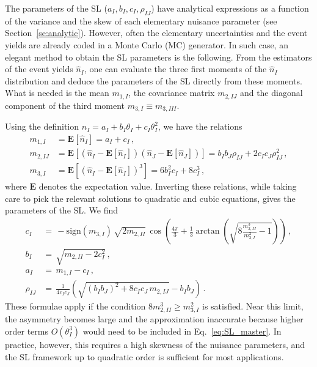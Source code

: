 \documentclass[11pt]{article}
\begin{document}
The parameters of the SL ($a_I, b_I, c_I, \rho_{IJ}$) have analytical expressions
as a function of the variance and the skew  of each elementary nuisance parameter (see Section~\ref{se:analytic}). However, often the elementary uncertainties and the event yields are already coded in a Monte Carlo (MC) generator. In such case, %
an elegant method to obtain the SL parameters  is the following. From the estimators of the event yields $\hat n_I$, one can evaluate the three first moments of the $\hat n_I$ distribution and deduce the parameters of the SL directly from these moments.
What is needed is the mean $m_{1,I}$, the covariance matrix $m_{2,IJ}$ and the diagonal component of the third moment $m_{3,I} \equiv m_{3,III}$. %

Using the definition $ n_I= a_I+b_I \theta_I+c_I \theta_I^2 $, we have the relations
%
\begin{align} \label{eq:moments1}
  m_{1,I} &= \mathbf{E}[\hat n_I]= a_I+c_I\,,\\
  m_{2,IJ} &= \mathbf{E}[(\hat n_I - \mathbf{E}[\hat n_I])(\hat n_J - \mathbf{E}[\hat n_J]) ]= b_I b_J \rho_{IJ}+2 c_I c_J\rho_{IJ}^2\,,\\
  m_{3,I} &= \mathbf{E}[(\hat n_I - \mathbf{E}[\hat n_I])^3 ]=   6 b_I^2 c_I+8 c_I^3 \, ,
  \label{eq:moments2}
\end{align}
%
where $\mathbf{E}$ denotes the expectation value.
Inverting these relations, while taking care to pick the relevant solutions to quadratic and cubic equations, gives the parameters of the SL.  We find
%
\begin{align}
c_I &= \, -\mathrm{sign}(m_{3,I}) \, \sqrt{2 m_{2,II}} \, \cos\!\left(\frac{4\pi}{3}+\frac{1}{3}\arctan\left(\sqrt{8 \frac{m^3_{2,II}}{m^2_{3,I}}-1}\right)  \right)\, , \label{eq:solutions1}
\\
b_I &= \, \sqrt{m_{2,II}-2 c_I^2 }\,,\\
a_I &= \, m_{1,I}- c_I\,,\\
\rho_{IJ} &= \, \frac{1}{4 c_I c_J}\left( \sqrt{(b_I b_J)^2+8 c_I c_J\,m_{2,IJ}}-b_I b_J \right) \, .
\label{eq:solutions2}
\end{align}
%
These formulae apply if the condition $8 m_{2,II}^3\geq m_{3,I}^2$ is satisfied. %
Near this limit,  the asymmetry becomes large and the approximation inaccurate  
because higher order terms $O(\theta_I^3)$  would need to be included in %
Eq.~\eqref{eq:SL_master}. In practice, however, this requires a high skewness of the nuisance parameters, and the SL framework up to quadratic order is sufficient for most applications.
\end{document}
